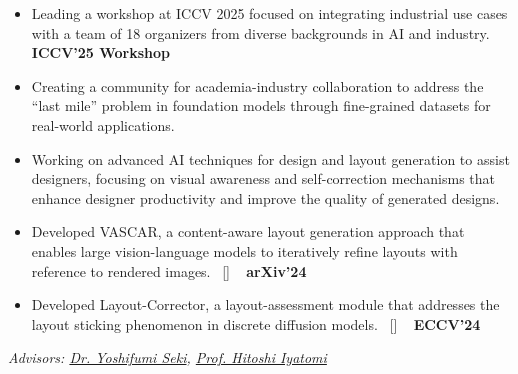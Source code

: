 
\begin{projects}
	{
		\begin{itemize}
			\setlength\itemsep{0.3em}
			\item Leading a workshop at ICCV 2025 focused on integrating industrial use cases with a team of 18 organizers from diverse backgrounds in AI and industry.~ {\small{\lbrack\textbf{{ICCV'25 Workshop}}\rbrack}}
			\item Creating a community for academia-industry collaboration to address the ``last mile'' problem in foundation models through fine-grained datasets for real-world applications.
		\end{itemize}
	}
	{
		\begin{itemize}
			\setlength\itemsep{0.3em}
			\item Working on advanced AI techniques for design and layout generation to assist designers, focusing on visual awareness and self-correction mechanisms that enhance designer productivity and improve the quality of generated designs.
			\item Developed VASCAR, a content-aware layout generation approach that enables large vision-language models to iteratively refine layouts with reference to rendered images.~ [\href{https://arxiv.org/abs/2412.04237}{\small{\arxivSymbol}}] ~ {\small{\lbrack\textbf{{arXiv'24}}\rbrack}}
			\item Developed Layout-Corrector, a layout-assessment module that addresses the layout sticking phenomenon in discrete diffusion models.~ [\href{https://github.com/line/Layout-Corrector}{\small{\arxivSymbol}}] ~ {\small{\lbrack\textbf{{ECCV'24}}\rbrack}}
		\end{itemize}
	}
	{
		\textit{Advisors:  \href{https://scholar.google.com/citations?user=LoZ7VeYAAAAJ}{Dr. Yoshifumi Seki}, \href{https://iyatomi-lab.info/english/people/2013-6-8}{Prof. Hitoshi Iyatomi}}
	}
	{
		\begin{itemize}
			\setlength\itemsep{0.3em}

\end{itemize}}
\end{projects}
